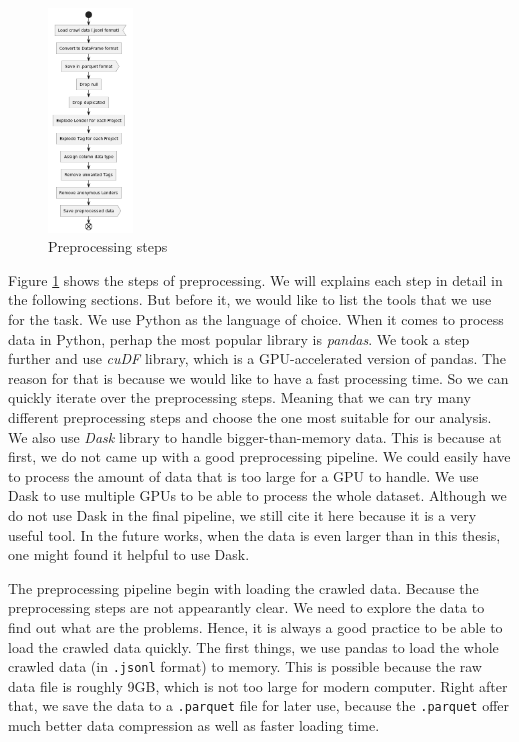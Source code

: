 \begin{figure}[H]
	\centering
	\includegraphics[width=0.2\textwidth]{images/graphuml/preprocessing.png}
	\caption{Preprocessing steps}
	\label{fig:preprocessing}
\end{figure}

Figure \ref{fig:preprocessing} shows the steps of preprocessing.
We will explains each step in detail in the following sections.
But before it, we would like to list the tools that we use for the task.
We use Python as the language of choice.
When it comes to process data in Python, perhap the most popular library is \textit{pandas}\cite{pandas}.
We took a step further and use \textit{cuDF}\cite{cudf} library, which is a GPU-accelerated version of pandas.
The reason for that is because we would like to have a fast processing time.
So we can quickly iterate over the preprocessing steps.
Meaning that we can try many different preprocessing steps and choose the one most suitable for our analysis.
We also use \textit{Dask}\cite{dask} library to handle bigger-than-memory data.
This is because at first, we do not came up with a good preprocessing pipeline.
We could easily have to process the amount of data that is too large for a GPU to handle.
We use Dask to use multiple GPUs to be able to process the whole dataset.
Although we do not use Dask in the final pipeline, we still cite it here because it is a very useful tool.
In the future works, when the data is even larger than in this thesis, one might found it helpful to use Dask.

The preprocessing pipeline begin with loading the crawled data.
Because the preprocessing steps are not appearantly clear.
We need to explore the data to find out what are the problems.
Hence, it is always a good practice to be able to load the crawled data quickly.
The first things, we use pandas to load the whole crawled data (in \lstinline|.jsonl| format) to memory.
This is possible because the raw data file is roughly 9GB, which is not too large for modern computer.
Right after that, we save the data to a \lstinline|.parquet| file for later use,
because the \lstinline|.parquet| offer much better data compression as well as faster loading time.

